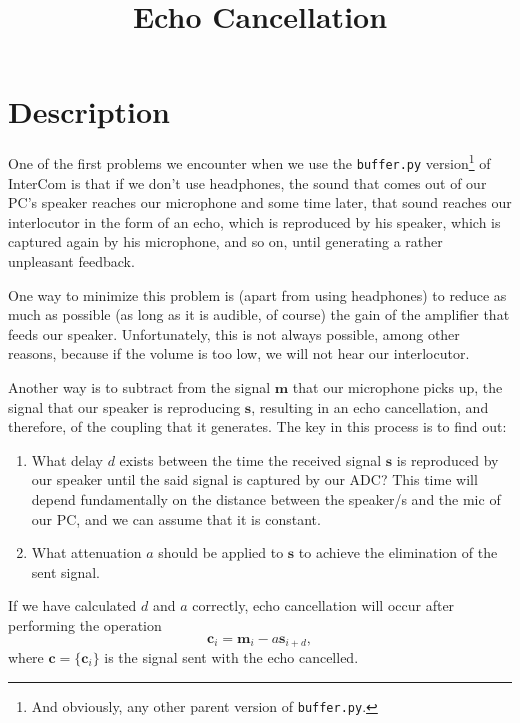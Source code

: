 
\title{Echo Cancellation}

\maketitle

\section{Description}


One of the first problems we encounter when we use the
\texttt{buffer.py} version\footnote{And obviously, any other parent
  version of \texttt{buffer.py}.} of InterCom is that if we don't use
headphones, the sound that comes out of our PC's speaker reaches our
microphone and some time later, that sound reaches our interlocutor in
the form of an echo, which is reproduced by his speaker, which is
captured again by his microphone, and so on, until generating a rather
unpleasant feedback.

One way to minimize this problem is (apart from using headphones) to
reduce as much as possible (as long as it is audible, of course) the
gain of the amplifier that feeds our speaker. Unfortunately, this is
not always possible, among other reasons, because if the volume is too
low, we will not hear our interlocutor.

Another way is to subtract from the signal ${\mathbf m}$ that our microphone picks
up, the signal that our speaker is reproducing
${\mathbf s}$, resulting in an echo cancellation, and therefore, of
the coupling that it generates. The key in this process is to find
out:

\begin{enumerate}
\item What delay $d$ exists between the time the received signal
  ${\mathbf s}$ is reproduced by our speaker until the said signal is
  captured by our ADC? This time will depend fundamentally on the
  distance between the speaker/s and the mic of our PC, and we can
  assume that it is constant.

\item What attenuation $a$ should be applied to ${\mathbf s}$ to
  achieve the elimination of the sent signal.
\end{enumerate}

If we have calculated $d$ and $a$ correctly, echo cancellation will
occur after performing the operation
\begin{equation}
   {\mathbf c}_i = {\mathbf m}_i - a{\mathbf s}_{i+d},
\end{equation}
where ${\mathbf c}=\{{\mathbf c}_i\}$ is the signal sent with the echo cancelled.

